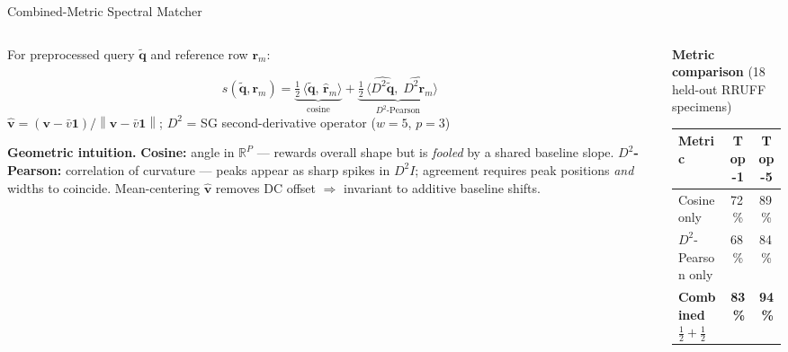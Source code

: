 \documentclass[aspectratio=169,10pt]{beamer}
\newcommand{\norm}[1]{\left\|#1\right\|}
\begin{document}
\begin{frame}{Combined-Metric Spectral Matcher}
  \begin{columns}[T]
    \begin{column}{0.55\textwidth}
      For preprocessed query $\tilde{\mathbf{q}}$ and reference row $\mathbf{r}_m$:
      \begin{tcolorbox}[mathbox, top=3pt, bottom=3pt]
        \[
          s(\tilde{\mathbf{q}},\mathbf{r}_m)
          =
          \underbrace{\tfrac{1}{2}\,\langle\tilde{\mathbf{q}},\,\hat{\mathbf{r}}_m\rangle}_{\text{cosine}}
          +
          \underbrace{\tfrac{1}{2}\,
            \bigl\langle\widehat{D^2\tilde{\mathbf{q}}},\;
                        \widehat{D^2\mathbf{r}_m}\bigr\rangle}_{D^2\text{-Pearson}}
        \]
        \centering\scriptsize
        $\hat{\mathbf{v}}=(\mathbf{v}-\bar{v}\mathbf{1})/
         \norm{\mathbf{v}-\bar{v}\mathbf{1}}$;\quad
        $D^2$ = SG second-derivative operator ($w{=}5$, $p{=}3$)
      \end{tcolorbox}

      \vspace{0.08cm}
      \begin{tcolorbox}[insightbox, top=2pt, bottom=2pt]
        \scriptsize\textbf{Geometric intuition.}
        \textbf{Cosine:} angle in $\mathbb{R}^P$ --- rewards overall shape
        but is \emph{fooled} by a shared baseline slope.
        \textbf{$D^2$-Pearson:} correlation of curvature --- peaks appear
        as sharp spikes in $D^2I$; agreement requires peak positions
        \emph{and} widths to coincide.
        Mean-centering $\hat{\mathbf{v}}$ removes DC offset $\Rightarrow$
        invariant to additive baseline shifts.
      \end{tcolorbox}
    \end{column}
    \begin{column}{0.42\textwidth}
      \textbf{Metric comparison} (18 held-out RRUFF specimens)

      \vspace{0.06cm}
      \footnotesize
      \begin{tabular}{@{}lcc@{}}
        \toprule
        \textbf{Metric} & \textbf{Top-1} & \textbf{Top-5}\\
        \midrule
        Cosine only       & 72\,\% & 89\,\%\\
        $D^2$-Pearson only & 68\,\% & 84\,\%\\
        \textbf{Combined} $\frac{1}{2}+\frac{1}{2}$
                          & \textbf{83\,\%} & \textbf{94\,\%}\\
        \bottomrule
      \end{tabular}


\end{column}
\end{columns}
\end{frame}
\end{document}
